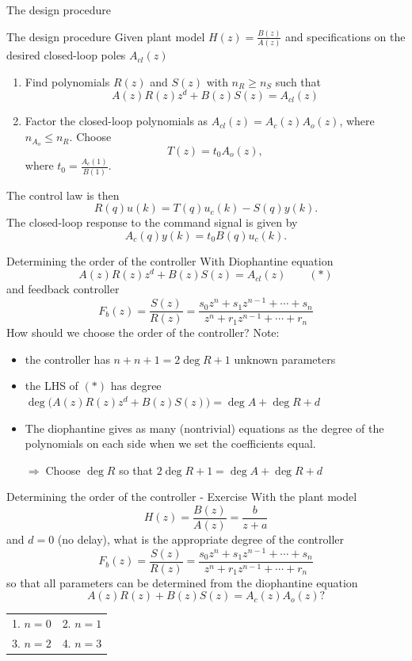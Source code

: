 \documentclass[presentation,aspectratio=169]{beamer}
\begin{document}
\begin{frame}[label={sec:org73a5512}]{The design procedure}
\end{frame}
\begin{frame}[label={sec:org07f51fc}]{The design procedure}
Given plant model \(H(z)=\frac{B(z)}{A(z)}\) and specifications on the desired closed-loop poles \(A_{cl}(z)\)
\begin{enumerate}
\item Find polynomials \(R(z)\) and \(S(z)\) with \(n_R \ge n_S\) such that 
\[ A(z)R(z)z^{d} + B(z)S(z) = A_{cl}(z) \]
\item Factor the closed-loop polynomials as \(A_{cl}(z) = A_c(z)A_o(z)\), where \(n_{A_o} \le n_R\). Choose
\[T(z) = t_0 A_o(z),\] where \(t_0 = \frac{A_c(1)}{B(1)}\).
\end{enumerate}

The control law is then
\[ R(q) u(k) = T(q)u_c(k) - S(q)y(k). \]
The closed-loop response to the command signal is given by
\[ A_c(q)y(k) = t_0 B(q) u_c(k). \]
\end{frame}
\begin{frame}[label={sec:org1a53433}]{Determining the order of the controller}
With Diophantine equation 
   \[ A(z)R(z)z^{d} + B(z)S(z) = A_{cl}(z) \qquad (*) \]
and feedback controller
\[F_b(z) = \frac{S(z)}{R(z)} = \frac{s_0z^n + s_1z^{n-1} + \cdots + s_n}{z^n + r_1 z^{n-1} + \cdots + r_n}\]
\alert{How should we choose the order of the controller?} Note:
\begin{itemize}
\item the controller has \(n+n+1 = 2\deg R + 1\) unknown parameters
\item the LHS of \((*)\) has degree \(\deg \big(A(z)R(z)z^d + B(z)S(z)\big) = \deg A + \deg R + d\)
\item The diophantine gives as many (nontrivial) equations as the degree of the polynomials on each side when we set the coefficients equal.

\alert{\(\Rightarrow\;\)Choose \(\deg R\) so that \(2\deg R + 1 = \deg A + \deg R + d\)}
\end{itemize}
\end{frame}


\begin{frame}[label={sec:org2ebbb1d}]{Determining the order of the controller - Exercise}
With the plant model \[H(z) = \frac{B(z)}{A(z)} = \frac{b}{z + a}\] and \(d=0\) (no delay), what is the appropriate degree of the controller 
\[F_b(z) = \frac{S(z)}{R(z)} = \frac{s_0z^n + s_1z^{n-1} + \cdots + s_n}{z^n + r_1 z^{n-1} + \cdots + r_n}\]
so that all parameters can be determined from the diophantine equation
\[ A(z)R(z) + B(z)S(z) = A_c(z)A_o(z)?\]
\begin{center}
\begin{tabular}{ll}
1. \(n = 0\) & 2. \(n = 1\)\\
3. \(n=2\) & 4. \(n=3\)\\
\end{tabular}
\end{center}
\end{frame}
\end{document}
